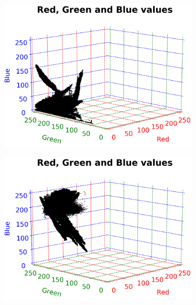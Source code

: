 \vspace{1mm}

\begin{figure}[H]
	\centering
	\begin{minipage}{0.5\textwidth}
		\centering
		\includegraphics[width=0.9\textwidth]{img/rgbGreen.png}
		\captionsetup{width=0.9\textwidth}
		\label{rgbGreenPlot}
	\end{minipage}%
	\begin{minipage}{0.5\textwidth}
		\centering
		\includegraphics[width=0.9\textwidth]{img/rgbBlueGreen.png}
		\captionsetup{width=0.9\textwidth}
		\label{rgbBlueGreenPlot}
	\end{minipage}
\end{figure}

